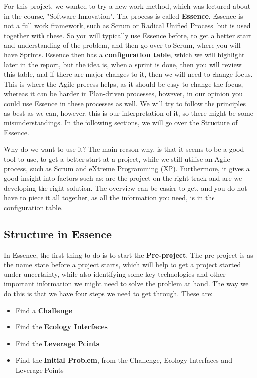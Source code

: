 For this project, we wanted to try a new work method, which was lectured about in the course, "Software Innovation".
The process is called \textbf{Essence}.
Essence is not a full work framework, such as Scrum or Radical Unified Process, but is used together with these.
So you will typically use Essence before, to get a better start and understanding of the problem, and then go over to Scrum, where you will have Sprints. 
Essence then has a \textbf{configuration table}, which we will highlight later in the report, but the idea is, when a sprint is done, then you will review this table, and if there are major changes to it, then we will need to change focus.
This is where the Agile process helps, as it should be easy to change the focus, whereas it can be harder in Plan-driven processes, however, in our opinion you could use Essence in these processes as well. 
We will try to follow the principles as best as we can, however, this is our interpretation of it, so there might be some misunderstandings.
In the following sections, we will go over the Structure of Essence.

Why do we want to use it?
The main reason why, is that it seems to be a good tool to use, to get a better start at a project, while we still utilise an Agile process, such as Scrum and eXtreme Programming (XP).
Furthermore, it gives a good insight into factors such as; are the project on the right track and are we developing the right solution.
The overview can be easier to get, and you do not have to piece it all together, as all the information you need, is in the configuration table.

\subsection{Structure in Essence}
In Essence, the first thing to do is to start the \textbf{Pre-project}.
The pre-project is as the name state before a project starts, which will help to get a project started under uncertainty, while also identifying some key technologies and other important information we might need to solve the problem at hand.
The way we do this is that we have four steps we need to get through.
These are:

\begin{itemize}
    \item Find a \textbf{Challenge}
    \item Find the \textbf{Ecology Interfaces}
    \item Find the \textbf{Leverage Points}
    \item Find the \textbf{Initial Problem}, from the Challenge, Ecology Interfaces and Leverage Points
\end{itemize}


